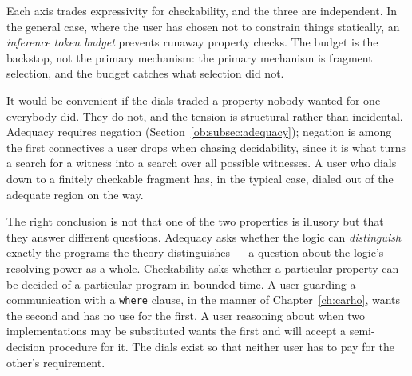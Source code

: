 Each axis trades expressivity for checkability, and the three are independent. In the
general case, where the user has chosen not to constrain things statically, an
\emph{inference token budget} prevents runaway property checks. The budget is the backstop,
not the primary mechanism: the primary mechanism is fragment selection, and the budget
catches what selection did not.

\begin{remark}
\label{ob:rem:tension}
It would be convenient if the dials traded a property nobody wanted for one everybody did.
They do not, and the tension is structural rather than incidental. Adequacy requires
negation (Section~\ref{ob:subsec:adequacy}); negation is among the first connectives a user
drops when chasing decidability, since it is what turns a search for a witness into a
search over all possible witnesses. A user who dials down to a finitely checkable fragment
has, in the typical case, dialed out of the adequate region on the way.

The right conclusion is not that one of the two properties is illusory but that they
answer different questions. Adequacy asks whether the logic can \emph{distinguish} exactly
the programs the theory distinguishes --- a question about the logic's resolving power as a
whole. Checkability asks whether a particular property can be decided of a particular
program in bounded time. A user guarding a communication with a \texttt{where} clause,
in the manner of Chapter~\ref{ch:carho}, wants the second and has no use for the first. A user reasoning about when two
implementations may be substituted wants the first and will accept a semi-decision
procedure for it. The dials exist so that neither user has to pay for the other's
requirement.
\end{remark}

